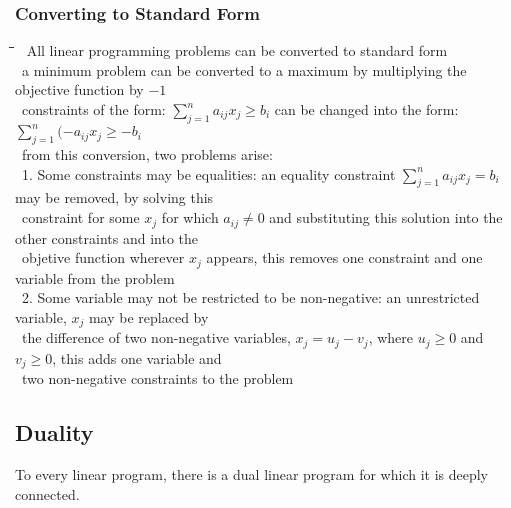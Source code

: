 \documentclass[10pt,letterpaper]{scrartcl}
\newcommand{\tbul}{\textbullet}
\newcommand{\tend}{\>\textendash}
\newcommand{\tabDef}{\hspace{2em}\=\hspace{2em}\=\hspace{2em}\=\hspace{2em}\=\kill}
\begin{document}
\subsubsection*{Converting to Standard Form}\begin{tabbing}\tabDef
\tbul\ All linear programming problems can be converted to standard form \\
\tbul\ a minimum problem can be converted to a maximum by multiplying the objective function by $-1$\\
\tend\ constraints of the form: $\displaystyle\sum_{j=1}^{n}a_{ij}x_j\geq b_i$ can be changed into the form: $\displaystyle\sum_{j=1}^{n}(-a_{ij}x_j\geq -b_i$ \\
\tend\ from this conversion, two problems arise: \\
\>\>\ 1. Some constraints may be equalities: an equality constraint $\displaystyle\sum_{j=1}^{n}a_{ij}x_j=b_i$ may be removed, by solving this \\ \>\>\ constraint for some $x_j$ for which $a_{ij}\neq 0$ and substituting this solution into the other constraints and into the \\ \>\>\ objetive function wherever $x_j$ appears, this removes one constraint and one variable from the problem \\
\>\>\ 2. Some variable may not be restricted to be non-negative: an unrestricted variable, $x_j$ may be replaced by \\ \>\>\ the difference of two non-negative variables, $x_j=u_j-v_j$, where $u_j\geq 0$ and $v_j\geq 0$, this adds one variable and \\ \>\>\ two non-negative constraints to the problem \end{tabbing}
\subsection{Duality}
To every linear program, there is a dual linear program for which it is deeply connected. \\
\end{document}
